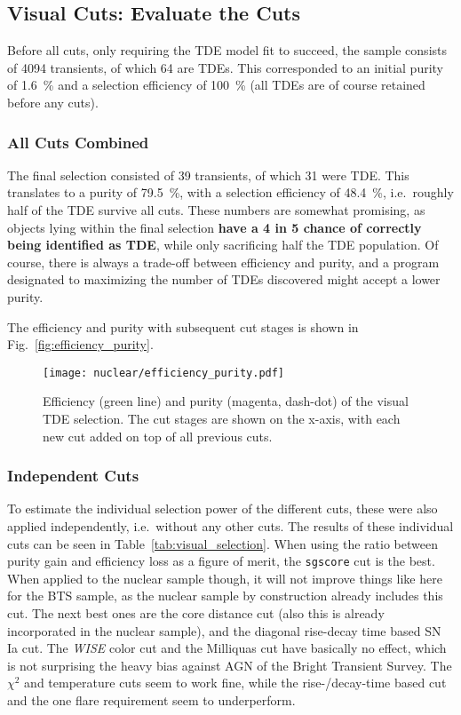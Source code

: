 \subsection{Visual Cuts: Evaluate the Cuts}
Before all cuts, only requiring the TDE model fit to succeed, the sample consists of 4094 transients, of which 64 are TDEs. This corresponded to an initial purity of \SI{1.6}{\percent} and a selection efficiency of \SI{100}{\percent} (all TDEs are of course retained before any cuts).

\subsubsection{All Cuts Combined}
The final selection consisted of 39 transients, of which 31 were TDE. This translates to a purity of \SI{79.5}{\percent}, with a selection efficiency of \SI{48.4}{\percent}, i.e.~roughly half of the TDE survive all cuts. These numbers are somewhat promising, as objects lying within the final selection \textbf{have a 4 in 5 chance of correctly being identified as TDE}, while only sacrificing half the TDE population. Of course, there is always a trade-off between efficiency and purity, and a program designated to maximizing the number of TDEs discovered might accept a lower purity.

The efficiency and purity with subsequent cut stages is shown in Fig.~\ref{fig:efficiency_purity}.

\begin{figure}[htpb]
    \texttt{[image: nuclear/efficiency\_purity.pdf]}
    \caption[Visual TDE selection]{Efficiency (green line) and purity (magenta, dash-dot) of the visual TDE selection. The cut stages are shown on the x-axis, with each new cut added on top of all previous cuts.}
\end{figure}

\subsubsection{Independent Cuts}
To estimate the individual selection power of the different cuts, these were also applied independently, i.e.~without any other cuts. The results of these individual cuts can be seen in Table~\ref{tab:visual_selection}. When using the ratio between purity gain and efficiency loss as a figure of merit, the \texttt{sgscore} cut is the best. When applied to the nuclear sample though, it will not improve things like here for the BTS sample, as the nuclear sample by construction already includes this cut. The next best ones are the core distance cut (also this is already incorporated in the nuclear sample), and the diagonal rise-decay time based SN Ia cut.  The \textit{WISE} color cut and the Milliquas cut have basically no effect, which is not surprising the heavy bias against AGN of the Bright Transient Survey. The $\chi^2$ and temperature cuts seem to work fine, while the rise-/decay-time based cut and the one flare requirement seem to underperform.


